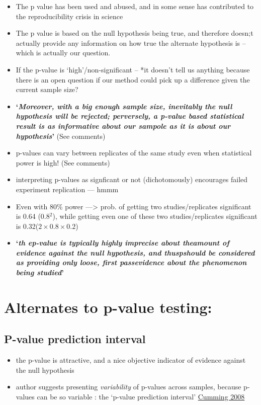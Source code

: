 \documentclass[
]{book}
\providecommand{\tightlist}{%
  \setlength{\itemsep}{0pt}\setlength{\parskip}{0pt}}
\begin{document}
\begin{itemize}
\item
  The p value has been used and abused, and in some sense has contributed to the reproducibility crisis in science
\item
  The p value is based on the null hypothesis being true, and therefore doesn;t actually provide any information on how true the alternate hypothesis is -- which is actually our question.
\item
  If the p-value is `high'/non-significant -- *it doesn't tell us anything because there is an open question if our method could pick up a difference given the current sample size?
\item
  \textbf{`\emph{Moreover, with a big enough sample size, inevitably the null hypothesis will be rejected; perversely, a p-value based statistical result is as informative about our sampole as it is about our hypothesis}'} (See comments)
\item
  p-values can vary between replicates of the same study even when statistical power is high! (See comments)
\item
  interpreting p-values as signficant or not (dichotomously) encourages failed experiment replication --- hmmm
\item
  Even with 80\% power ---\textgreater{} prob. of getting two studies/replicates significant is 0.64 (0.8\(^{2}\)), while getting even one of these two studies/replicates significant is 0.32(\(2\times0.8\times0.2\))
\item
  \textbf{`\emph{th ep-value is typically highly imprecise about theamount of evidence against the null hypothesis, and thuspshould be considered as providing only loose, first passevidence about the phenomenon being studied}'}
\end{itemize}

\hypertarget{alternates-to-p-value-testing}{%
\section{Alternates to p-value testing:}\label{alternates-to-p-value-testing}}

\hypertarget{p-value-prediction-interval}{%
\subsection{P-value prediction interval}\label{p-value-prediction-interval}}

\begin{itemize}
\tightlist
\item
  the p-value is attractive, and a nice objective indicator of evidence against the null hypothesis
\item
  author suggests presenting \emph{variability} of p-values across samples, because p-values can be so variable : the `p-value prediction interval' \href{http://methods.sagepub.com/journal-article/sage-quantitative-research-methods/replication_and_p_intervals_p_values_predict_the_future_only_vaguely_but_confidence_intervals_do_much_better/d36.xml}{Cumming 2008}
\end{itemize}
\end{document}
